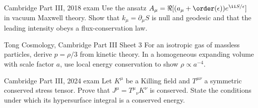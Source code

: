 \begin{exercises}
\begin{exercise}{Cambridge Part III, 2018 exam}
Use the ansatz
\(A_\mu=\Re[(a_\mu+\order(\epsilon))e^{\ii S/\epsilon}]\) in vacuum Maxwell
theory.  Show that \(k_\mu=\partial_\mu S\) is null and geodesic and that the
leading intensity obeys a flux-conservation law.
\end{exercise}

\begin{exercise}{Tong Cosmology, Cambridge Part III Sheet 3}
For an isotropic gas of massless particles, derive \(p=\rho/3\) from kinetic
theory.  In a homogeneous expanding volume with scale factor \(a\), use local
energy conservation to show \(\rho\propto a^{-4}\).
\end{exercise}

\begin{exercise}{Cambridge Part III, 2024 exam}
Let \(K^\mu\) be a Killing field and \(T^{\mu\nu}\) a symmetric conserved
stress tensor.  Prove that \(J^\mu=T^\mu{}_\nu K^\nu\) is conserved.  State
the conditions under which its hypersurface integral is a conserved energy.
\end{exercise}



\end{exercises}

